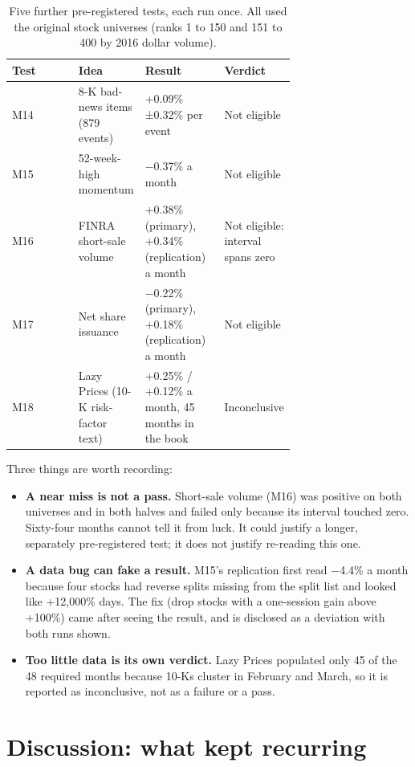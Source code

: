 \documentclass[11pt,a4paper]{article}
\providecommand{\tightlist}{\setlength{\itemsep}{0pt}\setlength{\parskip}{0pt}}
\begin{document}
\begin{table}[H]
\centering\small
\begin{tabular}{@{}lp{0.22\linewidth}p{0.28\linewidth}p{0.2\linewidth}@{}}
\toprule
Test & Idea & Result & Verdict\\
\midrule
M14 & 8-K bad-news items (879 events) & +0.09\% ±0.32\% per event & Not eligible\\
M15 & 52-week-high momentum & −0.37\% a month & Not eligible\\
M16 & FINRA short-sale volume & +0.38\% (primary), +0.34\% (replication) a month & Not eligible: interval spans zero\\
M17 & Net share issuance & −0.22\% (primary), +0.18\% (replication) a month & Not eligible\\
M18 & Lazy Prices (10-K risk-factor text) & +0.25\% / +0.12\% a month, 45 months in the book & Inconclusive\\
\bottomrule
\end{tabular}
\caption{Five further pre-registered tests, each run once. All used the original stock universes (ranks 1 to 150 and 151 to 400 by 2016 dollar volume).}\label{tbl:newresults}
\end{table}

Three things are worth recording:

\begin{itemize}
\tightlist
\item
  \textbf{A near miss is not a pass.} Short-sale volume (M16) was positive on both universes and in both halves and failed only
  because its interval touched zero. Sixty-four months cannot tell it from luck. It could justify a longer, separately
  pre-registered test; it does not justify re-reading this one.
\item
  \textbf{A data bug can fake a result.} M15's replication first read −4.4\% a month because four stocks had reverse splits
  missing from the split list and looked like +12,000\% days. The fix (drop stocks with a one-session gain above +100\%) came after
  seeing the result, and is disclosed as a deviation with both runs shown.
\item
  \textbf{Too little data is its own verdict.} Lazy Prices populated only 45 of the 48 required months because 10-Ks cluster in
  February and March, so it is reported as inconclusive, not as a failure or a pass.
\end{itemize}

\section{Discussion: what kept recurring}\label{sec:discussion}
\end{document}
